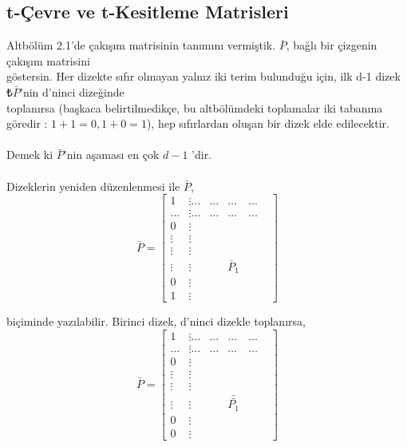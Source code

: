 \documentclass{amsbook}
\begin{document}



\setcounter{section}{3}
\setcounter{subsection}{2}
\subsection {t-Çevre ve t-Kesitleme Matrisleri}

\noindent Altbölüm 2.1'de çakışım matrisinin tanımını vermiştik. $\bar P$, bağlı bir çizgenin çakışım matrisini \\
göstersin. Her dizekte sıfır olmayan yalnız iki terim bulunduğu için, ilk d-1 dizek $ ₺\bar P$'nin d'ninci dizeğinde \\
toplanırsa (başkaca belirtilmedikçe, bu altbölümdeki toplamalar iki tabanına göredir : $ 1 + 1 = 0 , 1 + 0 = 1 $), hep 
sıfırlardan oluşan bir dizek elde edilecektir. \\ \\
Demek ki $\bar P$'nin aşaması en çok $d - 1$ 'dir.\\ \\

Dizeklerin yeniden düzenlenmesi ile $\bar P$, \\

\begin{equation*}
\bar P =
  \begin{bmatrix}
    1 & \vdots\hdots  & \hdots & \hdots & \hdots&\\
    \hdots & \vdots\hdots  & \hdots & \hdots & \hdots&\\
    0 & \vdots   &     &     &     &\\
     \vdots &  \vdots &     &     &     &\\
    \vdots & \vdots&     &     &     &\\
     \vdots &  \vdots &     &  \bar P_1  &     &\\
    0 & \vdots  &     &     &     &\\
    1 & \vdots  &     &     &     &
  \end{bmatrix}
  
\end{equation*}


biçiminde yazılabilir. Birinci dizek, d'ninci dizekle toplanırsa, \\


\begin{equation*}
\bar P =
  \begin{bmatrix}
    1 & \vdots\hdots  & \hdots & \hdots & \hdots&\\
    \hdots & \vdots\hdots  & \hdots & \hdots & \hdots&\\
    0 & \vdots   &     &     &     &\\
     \vdots &  \vdots &     &     &     &\\
    \vdots & \vdots&     &     &     &\\
     \vdots &  \vdots &     &  \bar {\bar{ P_1}}  &     &\\
    0 & \vdots  &     &     &     &\\
    0 & \vdots  &     &     &     &
  \end{bmatrix}
  
\end{equation*}
\end{document}
